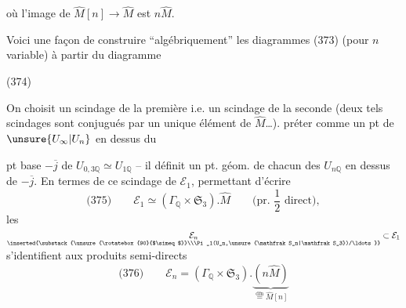 où l'image de $\widehat M[n]\longrightarrow\widehat M$ est $n\widehat M$.

Voici  une façon de construire ``algébriquement'' les diagrammes (373) (pour $n$ variable) à partir du diagramme

\noindent (374)

On choisit un  scindage de la première i.e. un scindage de la seconde (deux tels scindages sont conjugués par un unique élément de $\widehat M$\ldots).
 préter comme un pt  de $\unsure{U_\infty|U_n}$ en dessus du


pt base $-\overline j$ de $U_{0,3\mathbb Q}\simeq U_{1\mathbb Q}$ -- il définit un pt. géom. de chacun des $U_{n\mathbb Q}$ en dessus de $-\overline j$. En termes de ce scindage de $\mathcal E_1$, permettant d'écrire
\[
\text{(375)}\qquad \mathcal E_1\simeq(\Gamma_{\mathbb Q}\times\mathfrak S_3).\widehat M
\qquad\text{(pr. $\frac12$ direct)},
\]
les $\underset{\inserted{\substack{\unsure{\rotatebox{90}{$\simeq$}}\\\Pi_1(U_n,\unsure{\mathfrak S_n|\mathfrak S_3})/\ldots}}}{\mathcal E_n}\subset\mathcal E_1$ s'identifient aux produits semi-directs
\[
\text{(376)}\qquad \mathcal E_n=(\Gamma_{\mathbb Q}\times\mathfrak S_3).
\underbrace{(n\widehat M)}_{\overset{\text{dfn}}{=}\widehat M[n]}
\]

